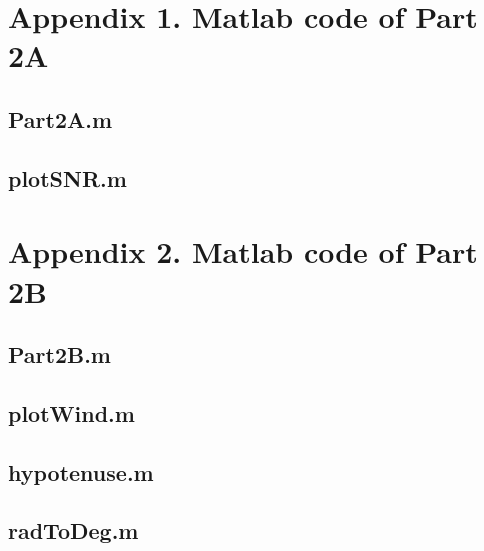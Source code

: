 \documentclass{article}
\begin{document}
\newpage
\section{Appendix 1. Matlab code of Part 2A}

\subsection{Part2A.m}


\subsection{plotSNR.m}


\newpage
\section{Appendix 2. Matlab code of Part 2B}

\subsection{Part2B.m}


\subsection{plotWind.m}


\subsection{hypotenuse.m}


\subsection{radToDeg.m}


\newpage
\end{document}
